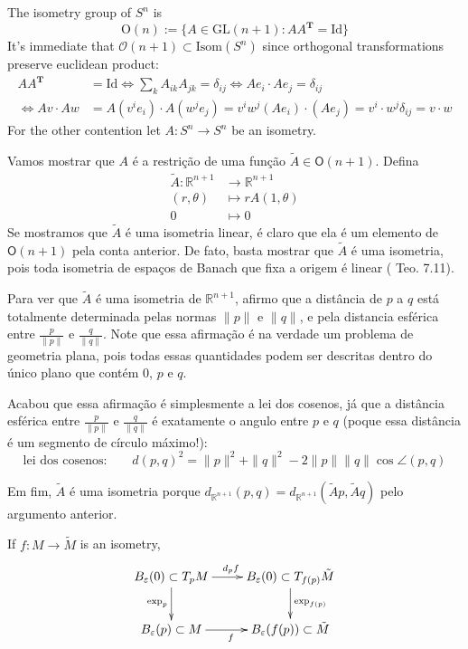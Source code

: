 \begin{example}
\label{example-isometry-group-of-Sn}
The isometry group of $S^n$ is
$$
\text{O}(n):=\{A\in\text{GL}(n+1):AA^{\mathbf{T}}=\text{Id}\}
$$
It's immediate that $\mathcal{O}(n+1)\subset \text{Isom}(S^n)$ since orthogonal
transformations preserve euclidean product:
\begin{align*}
A A^{\mathbf{T}}&=\text{Id}\iff \sum_k A_{ik}A_{jk}=\delta_{ij}
\iff Ae_i\cdot Ae_j=\delta_{ij}\\ 
\iff Av\cdot Aw&= A\left( v^ie_i\right) \cdot A\left( w^je_j\right) 
=v^iw^j (Ae_i)\cdot (Ae_j)
=v^i\cdot w^j\delta_{ij}=v\cdot w
\end{align*}
For the other contention let $A:S^n \to S^n$ be an isometry.

Vamos mostrar que $A$ é a restrição de uma função $\tilde{A} \in
\mathsf{O}(n+1)$. Defina
\begin{align*}
\tilde{A}: \mathbb{R}^{n+1} &\longrightarrow \mathbb{R}^{n+1} \\
(r,\theta) &\longmapsto rA(1,\theta)\\
0&\longmapsto 0
\end{align*}
Se mostramos que $\tilde{A}$ é uma isometria linear, é claro que ela é um
elemento de $\mathsf{O}(n+1)$ pela conta anterior. De fato, basta mostrar que
$\tilde{A}$ é uma isometria, pois toda isometria de espaços de Banach que fixa
a origem é linear (\cite{braga} Teo. 7.11).

Para ver que $\tilde{A}$ é uma isometria de $\mathbb{R}^{n+1}$,
afirmo que a distância de $p$ a $q$ está totalmente determinada
pelas normas  $\|p\|$ e $\|q\|$, e pela distancia esférica entre
$\frac{p}{\|p\|}$ e $\frac{q}{\|q\|}$. Note que essa afirmação é na verdade
um problema de geometria plana, pois todas essas quantidades podem ser descritas
dentro do único plano que contém $0$, $p$ e $q$.

Acabou que essa afirmação é simplesmente a lei dos cosenos, já que a distância
esférica entre $\frac{p}{\|p\|}$ e $\frac{q}{\|q\|}$ é exatamente o angulo
entre $p$ e $q$ (poque essa distância é um segmento de círculo máximo!):
\[\text{lei dos cosenos:} \qquad d(p,q)^2=\|p\|^2+\|q\|^2-2\|p\|\|q\| \cos
\angle(p,q) \]

Em fim, $\tilde{A}$ é uma isometria porque
$d_{\mathbb{R}^{n+1}}(p,q)=d_{\mathbb{R}^{n+1}}(\tilde{A}p,\tilde{A}q)$ pelo
argumento anterior.
\end{example}


\begin{proposition}
\label{proposition-naturallity-of-exponential}
If $f:M\to \tilde{M}$ is an isometry,
$$
\xymatrix{
B_\varepsilon(0)\subset T_pM \ar[r]^{d_p f} \ar[d]_{\text{exp}_p} &
B_\varepsilon(0)\subset T_{f(p)}\tilde{M} \ar[d]^{\text{exp}_{f(p)}} \\
B_\varepsilon(p)\subset M \ar[r]_{f} & B_\varepsilon(f(p))\subset \tilde{M}
}
$$
\end{proposition}

